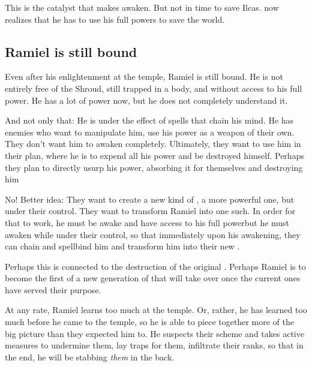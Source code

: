 This is the catalyst that makes \Sithiyacaan awaken. 
But not in time to save Ilcas. 
\Sithiyacaan now realizes that he has to use his full powers to save the world. 










\subsection{Ramiel is still bound}
Even after his enlightenment at the \Mystraacht{} temple, Ramiel is still bound. He is not entirely free of the Shroud, still trapped in a \human{} body, and without access to his full \sathariah{} power. He has a lot of power now, but he does not completely understand it. 

And not only that: He is under the effect of spells that chain his mind. He has enemies who want to manipulate him, use his power as a weapon of their own. They don't want him to awaken completely. Ultimately, they want to use him in their plan, where he is to expend all his power and be destroyed himself. Perhaps they plan to directly usurp his power, absorbing it for themselves and destroying him\prikker

No! Better idea: They want to create a new kind of \Sephirah, a more powerful one, but under their control. They want to transform Ramiel into one such. In order for that to work, he must be awake and have access to his full \sathariah{} power\prikker but he must awaken while under their control, so that immediately upon his awakening, they can chain and spellbind him and transform him into their new \Sephirah. 

Perhaps this is connected to the destruction of the original \Sephiroth. Perhaps Ramiel is to become the first of a new generation of \Sephiroth{} that will take over once the current ones have served their purpose. 

At any rate, Ramiel learns too much at the temple. Or, rather, he has learned too much before he came to the temple, so he is able to piece together more of the big picture than they expected him to. He suspects their scheme and takes active measures to undermine them, lay traps for them, infiltrate their ranks, so that in the end, he will be stabbing \emph{them} in the back. 







